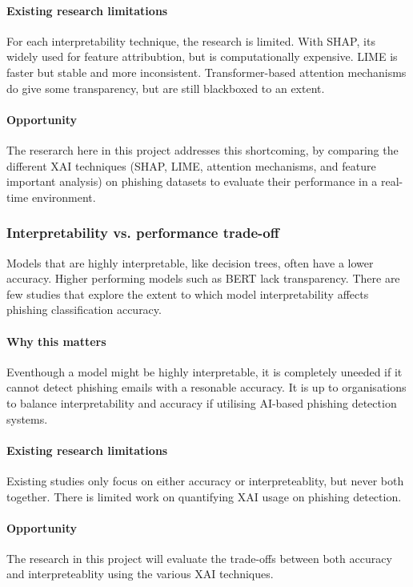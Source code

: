\paragraph{Existing research limitations}
For each interpretability technique, the research is limited. With SHAP, its widely used for feature attribubtion, but is computationally expensive. LIME is faster but stable and more inconsistent. Transformer-based attention mechanisms do give some transparency, but are still blackboxed to an extent.

\paragraph{Opportunity}
The reserarch here in this project addresses this shortcoming, by comparing the different XAI techniques (SHAP, LIME, attention mechanisms, and feature important analysis) on phishing datasets to evaluate their performance in a real-time environment.

\subsubsection*{Interpretability vs. performance trade-off}
Models that are highly interpretable, like decision trees, often have a lower accuracy. Higher performing models such as BERT lack transparency. There are few studies that explore the extent to which model interpretability affects phishing classification accuracy.

\paragraph{Why this matters}
Eventhough a model might be highly interpretable, it is completely uneeded if it cannot detect phishing emails with a resonable accuracy. It is up to organisations to balance interpretability and accuracy if utilising AI-based phishing detection systems.

\paragraph{Existing research limitations}
Existing studies only focus on either accuracy or interpreteablity, but never both together. There is limited work on quantifying XAI usage on phishing detection.

\paragraph{Opportunity}
The research in this project will evaluate the trade-offs between both accuracy and interpreteablity using the various XAI techniques.

